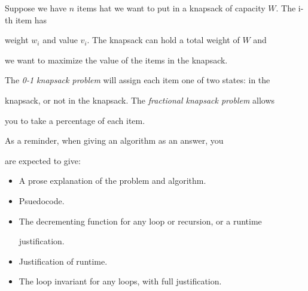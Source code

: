 \documentclass{article}
\begin{document}
\nextprob

Suppose we have $n$ items hat we want to put in a knapsack of capacity $W$.  The i-th item has

weight $w_i$ and value $v_i$.  The knapsack can hold a total weight of $W$ and

we want to maximize the value of the items in the knapsack.

The \emph{0-1 knapsack problem} will assign each item one of two states: in the

knapsack, or not in the knapsack.  The \emph{fractional knapsack problem} allows

you to take a percentage of each item.



As a reminder, when giving an algorithm as an answer, you

are expected to give:

\begin{itemize}

    \item A prose explanation of the problem and algorithm.

    \item Psuedocode.

    \item The decrementing function for any loop or recursion, or a runtime

        justification.

    \item Justification of runtime.

    \item The loop invariant for any loops, with full justification.

\end{itemize}
\end{document}
